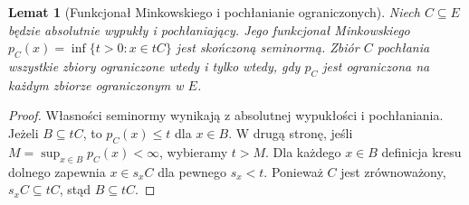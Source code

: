 \documentclass[11pt,a4paper]{article}
\numberwithin{equation}{section}
\theoremstyle{plain}
\newtheorem{lemat}[twierdzenie]{Lemat}
\theoremstyle{definition}
\theoremstyle{remark}
\begin{document}
\begin{lemat}[Funkcjonał Minkowskiego i pochłanianie ograniczonych]
\label{lem:minkowski-bornivorous}
Niech $C\subseteq E$ będzie absolutnie wypukły i
pochłaniający. Jego funkcjonał Minkowskiego
$p_C(x)=\inf\{t>0:x\in tC\}$ jest skończoną seminormą.
Zbiór $C$ pochłania wszystkie zbiory ograniczone wtedy
i tylko wtedy, gdy $p_C$ jest ograniczona na każdym
zbiorze ograniczonym w $E$.
\end{lemat}
\begin{proof}
Własności seminormy wynikają z absolutnej wypukłości i
pochłaniania. Jeżeli $B\subseteq tC$, to $p_C(x)\le t$
dla $x\in B$. W drugą stronę, jeśli
$M=\sup_{x\in B}p_C(x)<\infty$, wybieramy $t>M$.
Dla każdego $x\in B$ definicja kresu dolnego zapewnia
$x\in s_x C$ dla pewnego $s_x<t$. Ponieważ $C$ jest
zrównoważony, $s_xC\subseteq tC$, stąd $B\subseteq tC$.
\end{proof}
\end{document}
